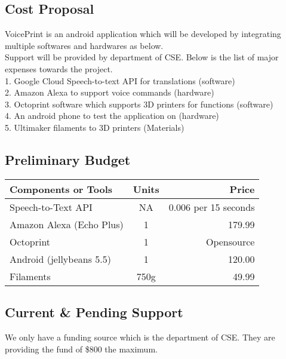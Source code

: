 \subsection{Cost Proposal}
VoicePrint is an android application which will be developed by integrating multiple softwares and hardwares as below.
\\
Support will be provided by department of CSE. Below is the list of major expenses towards the project.
\\
1. Google Cloud Speech-to-text API for translations (software)
\\
2. Amazon Alexa to support voice commands (hardware)
\\
3. Octoprint software which supports 3D printers for functions (software)
\\
4. An android phone to test the application on (hardware)
\\
5. Ultimaker filaments to 3D printers (Materials)

\subsection{Preliminary Budget}
\begin{tabular}{|l|c|r|}
	\hline
    Components or Tools & Units & Price\\
    \hline
    \hline
	Speech-to-Text API & NA & 0.006 per 15 seconds\\
	\hline
	Amazon Alexa (Echo Plus) & 1 & 179.99\\
	\hline
	Octoprint & 1 & Opensource\\
	\hline
	Android (jellybeans 5.5) & 1 & 120.00\\
	\hline
	Filaments & 750g & 49.99\\
	\hline
\end{tabular}

\subsection{Current \& Pending Support}
We only have a funding source which is the department of CSE. They are providing the fund of \$800 the maximum. \\

